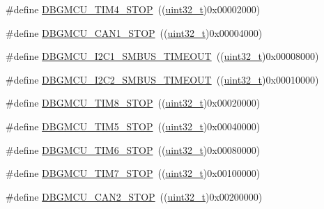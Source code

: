 \begin{DoxyCompactItemize}
\item 
\#define \hyperlink{group___d_b_g_m_c_u___exported___constants_gac87363a4018e2b23a907cfaf836494f1}{D\+B\+G\+M\+C\+U\+\_\+\+T\+I\+M4\+\_\+\+S\+T\+OP}~((\hyperlink{_p_e___types_8h_a33594304e786b158f3fb30289278f5af}{uint32\+\_\+t})0x00002000)
\item 
\#define \hyperlink{group___d_b_g_m_c_u___exported___constants_ga5ef70e050d1a95f350b6585336a55ca8}{D\+B\+G\+M\+C\+U\+\_\+\+C\+A\+N1\+\_\+\+S\+T\+OP}~((\hyperlink{_p_e___types_8h_a33594304e786b158f3fb30289278f5af}{uint32\+\_\+t})0x00004000)
\item 
\#define \hyperlink{group___d_b_g_m_c_u___exported___constants_ga1c0566af96833376cf1af98449cc914b}{D\+B\+G\+M\+C\+U\+\_\+\+I2\+C1\+\_\+\+S\+M\+B\+U\+S\+\_\+\+T\+I\+M\+E\+O\+UT}~((\hyperlink{_p_e___types_8h_a33594304e786b158f3fb30289278f5af}{uint32\+\_\+t})0x00008000)
\item 
\#define \hyperlink{group___d_b_g_m_c_u___exported___constants_ga316f8eba36b7a796dd3c6b7d6640b4bf}{D\+B\+G\+M\+C\+U\+\_\+\+I2\+C2\+\_\+\+S\+M\+B\+U\+S\+\_\+\+T\+I\+M\+E\+O\+UT}~((\hyperlink{_p_e___types_8h_a33594304e786b158f3fb30289278f5af}{uint32\+\_\+t})0x00010000)
\item 
\#define \hyperlink{group___d_b_g_m_c_u___exported___constants_gaa66feea7d5f2c253fe3f431f9dd4bd1e}{D\+B\+G\+M\+C\+U\+\_\+\+T\+I\+M8\+\_\+\+S\+T\+OP}~((\hyperlink{_p_e___types_8h_a33594304e786b158f3fb30289278f5af}{uint32\+\_\+t})0x00020000)
\item 
\#define \hyperlink{group___d_b_g_m_c_u___exported___constants_gaf97e21534b3aa9482af496497a37ff4b}{D\+B\+G\+M\+C\+U\+\_\+\+T\+I\+M5\+\_\+\+S\+T\+OP}~((\hyperlink{_p_e___types_8h_a33594304e786b158f3fb30289278f5af}{uint32\+\_\+t})0x00040000)
\item 
\#define \hyperlink{group___d_b_g_m_c_u___exported___constants_ga076cf7d18c7019e99f5f15962ab317eb}{D\+B\+G\+M\+C\+U\+\_\+\+T\+I\+M6\+\_\+\+S\+T\+OP}~((\hyperlink{_p_e___types_8h_a33594304e786b158f3fb30289278f5af}{uint32\+\_\+t})0x00080000)
\item 
\#define \hyperlink{group___d_b_g_m_c_u___exported___constants_gaf593ca16ee6d3f1fabc549878f3f87f0}{D\+B\+G\+M\+C\+U\+\_\+\+T\+I\+M7\+\_\+\+S\+T\+OP}~((\hyperlink{_p_e___types_8h_a33594304e786b158f3fb30289278f5af}{uint32\+\_\+t})0x00100000)
\item 
\#define \hyperlink{group___d_b_g_m_c_u___exported___constants_gace53677f1b7b9a52b592cf2b0f3f7178}{D\+B\+G\+M\+C\+U\+\_\+\+C\+A\+N2\+\_\+\+S\+T\+OP}~((\hyperlink{_p_e___types_8h_a33594304e786b158f3fb30289278f5af}{uint32\+\_\+t})0x00200000)

\end{DoxyCompactItemize}
